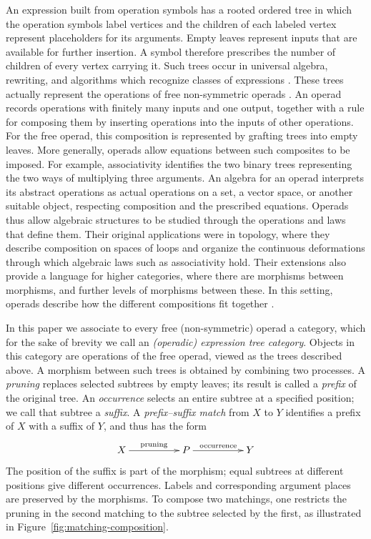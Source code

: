 \documentclass[11pt,a4paper]{article}
\theoremstyle{plain}
\theoremstyle{definition}
\theoremstyle{remark}
\begin{document}
An expression built from operation symbols has a rooted ordered tree in
which the operation symbols label vertices and the children of each
labeled vertex represent placeholders for its arguments. Empty leaves
represent inputs that are available for further insertion. A symbol
therefore prescribes the number of children of every vertex carrying
it. Such trees occur in universal algebra, rewriting, and algorithms
which recognize classes of expressions
\cite{BurrisSankappanavar,BaaderNipkow,TATA}. These trees actually represent the operations of free
non-symmetric operads \cite[Section~2.3]{Leinster}. An operad records operations with finitely many inputs and one
output, together with a rule for composing them by inserting
operations into the inputs of other operations. For the free
operad, this composition is represented by grafting trees into
empty leaves. More generally, operads allow equations between
such composites to be imposed. For example, associativity
identifies the two binary trees representing the two ways of
multiplying three arguments. An algebra for an operad interprets
its abstract operations as actual operations on a set, a vector
space, or another suitable object, respecting composition and
the prescribed equations. Operads thus allow algebraic structures
to be studied through the operations and laws that define them.
Their original applications were in topology, where they describe
composition on spaces of loops and organize the continuous
deformations through which algebraic laws such as associativity
hold. Their extensions also provide a language for higher
categories, where there are morphisms between morphisms, and
further levels of morphisms between these. In this setting,
operads describe how the different compositions fit together
\cite[Introduction and Section~2.2]{Leinster}.

In this paper we associate to every free (non-symmetric) operad a category, which for the sake of brevity we call an \emph{(operadic) expression tree category}. Objects in this category are operations of the free operad, viewed as the trees described above. A morphism between such trees is obtained by combining two processes. A
\emph{pruning} replaces selected subtrees by empty leaves; its
result is called a \emph{prefix} of the original tree. An \emph{occurrence}
selects an entire subtree at a specified position; we call that
subtree a \emph{suffix}. A \emph{prefix--suffix match} from $X$ to $Y$
identifies a prefix of $X$ with a suffix of $Y$, and thus has the
form
\[
\xymatrix@C=5em{
X\ar[r]^{\text{pruning}}&P\ar[r]^{\text{occurrence}}&Y
}
\]
The position of the suffix is part of the morphism; equal subtrees
at different positions give different occurrences. Labels and
corresponding argument places are preserved by the morphisms. To compose two
matchings, one restricts the pruning in the second matching to
the subtree selected by the first, as illustrated in Figure~\ref{fig:matching-composition}.
\end{document}
